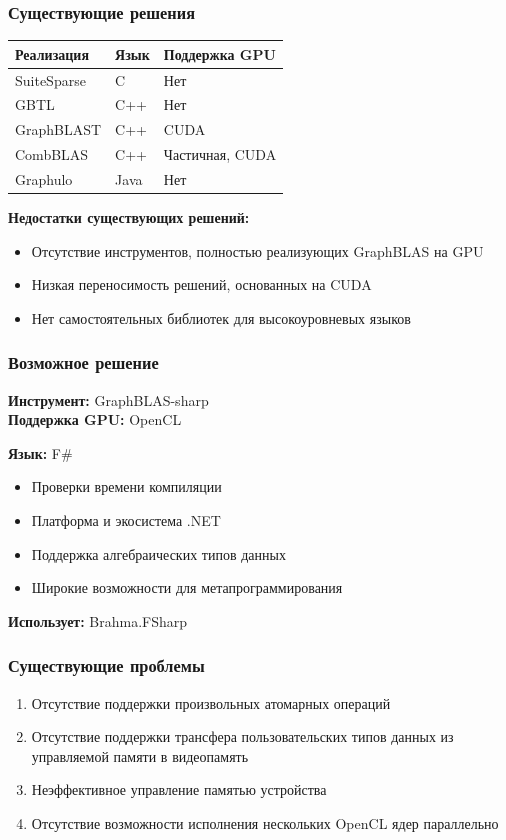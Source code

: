 \documentclass[aspectratio=169]{beamer}
\begin{document}
\begin{frame}  
  \frametitle{Существующие решения}
  \begin{table}[htbp]
    \begin{tabularx}{\textwidth}{X|X|l}
      Реализация & Язык & Поддержка GPU \\
      \hline
      SuiteSparse & C & Нет \\
      GBTL & C++ & Нет \\
      GraphBLAST & C++ & CUDA \\
      CombBLAS & C++ & Частичная, CUDA \\
      Graphulo & Java & Нет \\ 
      \hline
    \end{tabularx}
  \end{table}
  
  \bigskip
  \textbf{Недостатки существующих решений:}
  \begin{itemize}
    \item Отсутствие инструментов, полностью реализующих GraphBLAS на GPU
  	\item Низкая переносимость решений, основанных на CUDA
    \item Нет самостоятельных библиотек для высокоуровневых языков
  \end{itemize}
\end{frame}

\begin{frame}  
  \frametitle{Возможное решение}
  \begin{onehalfspace}
    \textbf{Инструмент:} GraphBLAS-sharp \\
    \textbf{Поддержка GPU:} OpenCL \\
  \end{onehalfspace}
    \textbf{Язык:} F\# \\
    \begin{itemize}
      \item Проверки времени компиляции
      \item Платформа и экосистема .NET
      \item Поддержка алгебраических типов данных 
      \item Широкие возможности для метапрограммирования
    \end{itemize}
    \textbf{Использует:} Brahma.FSharp
\end{frame}

\begin{frame}  
  \frametitle{Существующие проблемы}
  \begin{enumerate}
    \item Отсутствие поддержки произвольных атомарных операций
  	\item Отсутствие поддержки трансфера пользовательских типов данных из управляемой памяти в видеопамять
    \item Неэффективное управление памятью устройства
    \item Отсутствие возможности исполнения нескольких OpenCL ядер параллельно
  \end{enumerate}
\end{frame}
\end{document}
